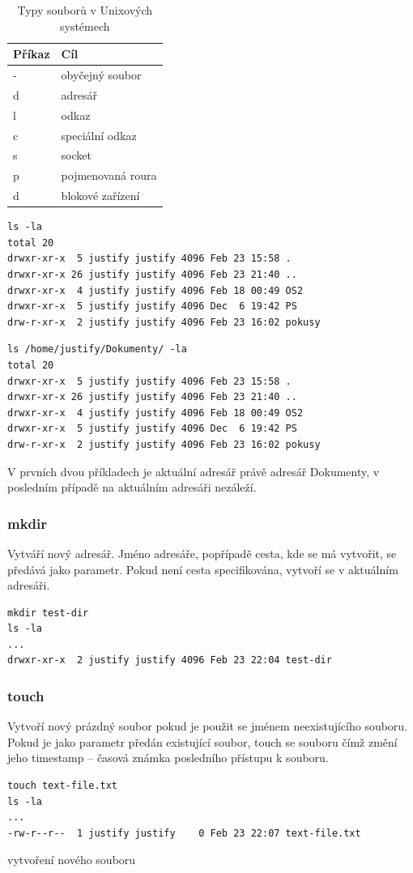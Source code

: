 \documentclass{article}
\begin{document}
\begin{table}
\begin{center}
\begin{tabular}{l | l}
Příkaz & Cíl\\
\hline
- & obyčejný soubor\\
d & adresář\\
l & odkaz\\
c & speciální odkaz\\
s & socket\\
p & pojmenovaná roura\\
d & blokové zařízení\\
\end{tabular}
\end{center}
\caption{Typy souborů v Unixových systémech}
\label{tabfiles}
\end{table}

\begin{verbatim}
ls -la
total 20
drwxr-xr-x  5 justify justify 4096 Feb 23 15:58 .
drwxr-xr-x 26 justify justify 4096 Feb 23 21:40 ..
drwxr-xr-x  4 justify justify 4096 Feb 18 00:49 OS2
drwxr-xr-x  5 justify justify 4096 Dec  6 19:42 PS
drw-r-xr-x  2 justify justify 4096 Feb 23 16:02 pokusy
\end{verbatim}

\begin{verbatim}
ls /home/justify/Dokumenty/ -la
total 20
drwxr-xr-x  5 justify justify 4096 Feb 23 15:58 .
drwxr-xr-x 26 justify justify 4096 Feb 23 21:40 ..
drwxr-xr-x  4 justify justify 4096 Feb 18 00:49 OS2
drwxr-xr-x  5 justify justify 4096 Dec  6 19:42 PS
drw-r-xr-x  2 justify justify 4096 Feb 23 16:02 pokusy
\end{verbatim}
V prvních dvou příkladech je aktuální adresář právě adresář Dokumenty, v posledním případě na aktuálním adresáři nezáleží.

\subsubsection{mkdir}
Vytváří nový adresář. Jméno adresáře, popřípadě cesta, kde se má vytvořit, se předává jako parametr. Pokud není cesta specifikována, vytvoří se v aktuálním adresáři.
\begin{verbatim}
mkdir test-dir
ls -la
...
drwxr-xr-x  2 justify justify 4096 Feb 23 22:04 test-dir
\end{verbatim}

\subsubsection{touch}
Vytvoří nový prázdný soubor pokud je použit se jménem neexistujícího souboru. Pokud je jako parametr předán existující soubor, touch se souboru  čímž změní jeho timestamp -- časová známka posledního přístupu k souboru.
\begin{verbatim}
touch text-file.txt
ls -la
...
-rw-r--r--  1 justify justify    0 Feb 23 22:07 text-file.txt
\end{verbatim}
vytvoření nového souboru
\end{document}
